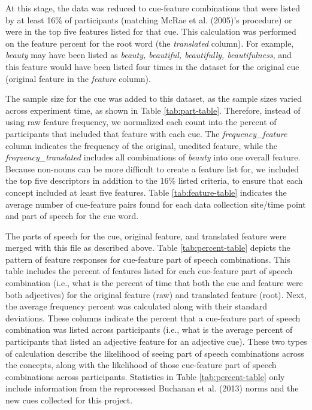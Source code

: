 \documentclass[english,,man]{apa6}
\theoremstyle{definition}
\theoremstyle{definition}
\theoremstyle{definition}
\theoremstyle{remark}
\begin{document}
At this stage, the data was reduced to cue-feature combinations that
were listed by at least 16\% of participants (matching McRae et al.
(2005)'s procedure) or were in the top five features listed for that
cue. This calculation was performed on the feature percent for the root
word (the \emph{translated} column). For example, \emph{beauty} may have
been listed as \emph{beauty, beautiful, beautifully, beautifulness}, and
this feature would have been listed four times in the dataset for the
original cue (original feature in the \emph{feature} column).

The sample size for the cue was added to this dataset, as the sample
sizes varied across experiment time, as shown in Table
\ref{tab:part-table}. Therefore, instead of using raw feature frequency,
we normalized each count into the percent of participants that included
that feature with each cue. The \emph{frequency\_feature} column
indicates the frequency of the original, unedited feature, while the
\emph{frequency\_translated} includes all combinations of \emph{beauty}
into one overall feature. Because non-nouns can be more difficult to
create a feature list for, we included the top five descriptors in
addition to the 16\% listed criteria, to ensure that each concept
included at least five features. Table \ref{tab:feature-table} indicates
the average number of cue-feature pairs found for each data collection
site/time point and part of speech for the cue word.

The parts of speech for the cue, original feature, and translated
feature were merged with this file as described above. Table
\ref{tab:percent-table} depicts the pattern of feature responses for
cue-feature part of speech combinations. This table includes the percent
of features listed for each cue-feature part of speech combination
(i.e., what is the percent of time that both the cue and feature were
both adjectives) for the original feature (raw) and translated feature
(root). Next, the average frequency percent was calculated along with
their standard deviations. These columns indicate the percent that a
cue-feature part of speech combination was listed across participants
(i.e., what is the average percent of participants that listed an
adjective feature for an adjective cue). These two types of calculation
describe the likelihood of seeing part of speech combinations across the
concepts, along with the likelihood of those cue-feature part of speech
combinations across participants. Statistics in Table
\ref{tab:percent-table} only include information from the reprocessed
Buchanan et al. (2013) norms and the new cues collected for this
project.
\end{document}
